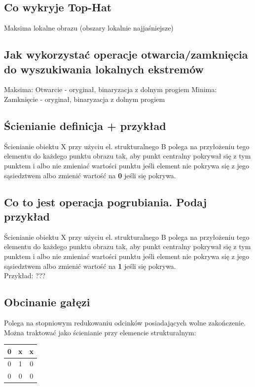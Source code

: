 \documentclass[a4paper, 12pt, titlepage]{article}
\begin{document}
\subsection{Co wykryje Top-Hat}
Maksima lokalne obrazu (obszary lokalnie najjaśniejsze)

\subsection{Jak wykorzystać operacje otwarcia/zamknięcia do wyszukiwania lokalnych ekstremów}
Maksima: Otwarcie - oryginał, binaryzacja z dolnym progiem
Minima: Zamknięcie - oryginał, binaryzacja z dolnym progiem

\subsection{Ścienianie definicja + przykład}
Ścienianie obiektu X przy użyciu el. strukturalnego B polega na przyłożeniu tego elementu do każdego punktu obrazu tak, aby punkt centralny pokrywał się z tym punktem i albo nie zmieniać wartości punktu jeśli element nie pokrywa się z jego sąsiedztwem albo zmienić wartość na \textbf{0} jeśli się pokrywa.

\subsection{Co to jest operacja pogrubiania. Podaj przykład}
Ścienianie obiektu X przy użyciu el. strukturalnego B polega na przyłożeniu tego elementu do każdego punktu obrazu tak, aby punkt centralny pokrywał się z tym punktem i albo nie zmieniać wartości punktu jeśli element nie pokrywa się z jego sąsiedztwem albo zmienić wartość na \textbf{1} jeśli się pokrywa. \\
Przykład: ???

\subsection{Obcinanie gałęzi}
Polega na stopniowym redukowaniu odcinków posiadających wolne zakończenie. Można traktować jako ścienianie przy elemencie strukturalnym:
\begin{tabular}{|c|c|c|}
	\hline
	0 & x & x \\ \hline
	0 & 1 & 0 \\ \hline
	0 & 0 & 0 \\ \hline
\end{tabular}
\end{document}
